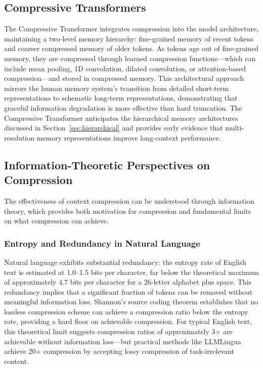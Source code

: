 \documentclass[11pt,letterpaper]{article}
\begin{document}
\subsection{Compressive Transformers}

The Compressive Transformer \cite{rae2020compressive} integrates compression into the model architecture, maintaining a two-level memory hierarchy: fine-grained memory of recent tokens and coarser compressed memory of older tokens. As tokens age out of fine-grained memory, they are compressed through learned compression functions---which can include mean pooling, 1D convolution, dilated convolution, or attention-based compression---and stored in compressed memory. This architectural approach mirrors the human memory system's transition from detailed short-term representations to schematic long-term representations, demonstrating that graceful information degradation is more effective than hard truncation. The Compressive Transformer anticipates the hierarchical memory architectures discussed in Section~\ref{sec:hierarchical} and provides early evidence that multi-resolution memory representations improve long-context performance.

\subsection{Information-Theoretic Perspectives on Compression}

The effectiveness of context compression can be understood through information theory, which provides both motivation for compression and fundamental limits on what compression can achieve.

\subsubsection{Entropy and Redundancy in Natural Language}

Natural language exhibits substantial redundancy: the entropy rate of English text is estimated at 1.0--1.5 bits per character, far below the theoretical maximum of approximately 4.7 bits per character for a 26-letter alphabet plus space. This redundancy implies that a significant fraction of tokens can be removed without meaningful information loss. Shannon's source coding theorem establishes that no lossless compression scheme can achieve a compression ratio below the entropy rate, providing a hard floor on achievable compression. For typical English text, this theoretical limit suggests compression ratios of approximately 3$\times$ are achievable without information loss---but practical methods like LLMLingua achieve 20$\times$ compression by accepting lossy compression of task-irrelevant content.
\end{document}
